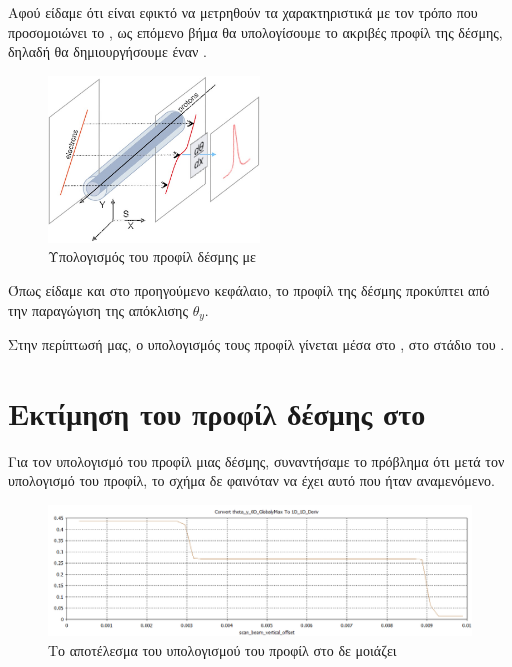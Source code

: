 Αφού είδαμε ότι είναι εφικτό να μετρηθούν τα χαρακτηριστικά με τον τρόπο που προσομοιώνει το , ως επόμενο βήμα θα υπολογίσουμε το ακριβές προφίλ της δέσμης, δηλαδή θα δημιουργήσουμε έναν .

\begin{figure}[tph]
\includegraphics[width=0.5\textwidth]{figures/EBS_profile_calculation}
\centering
\caption{Υπολογισμός του προφίλ δέσμης με }
\label{fig:EBS_profile_calculation}
\end{figure}

Όπως είδαμε και στο προηγούμενο κεφάλαιο, το προφίλ της δέσμης προκύπτει από την παραγώγιση  της απόκλισης $\theta_y$.

Στην περίπτωσή μας, ο υπολογισμός τους προφίλ γίνεται μέσα στο , στο στάδιο του .



\section{Εκτίμηση του προφίλ  δέσμης στο }

Για τον υπολογισμό του προφίλ μιας  δέσμης, συναντήσαμε το πρόβλημα ότι μετά τον υπολογισμό του προφίλ, το σχήμα δε φαινόταν να έχει αυτό που ήταν αναμενόμενο.

\begin{figure}[tph]
\includegraphics[width=\textwidth]{figures/CST_profile_steps}
\centering
\caption{Το αποτέλεσμα του υπολογισμού του προφίλ στο  δε μοιάζει }
\label{fig:CST_profile_steps}
\end{figure}

